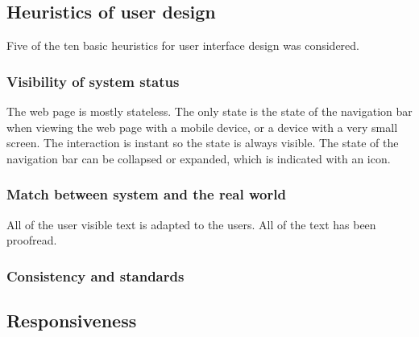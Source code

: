 \documentclass[a4paper]{scrartcl}
\begin{document}
\subsection{Heuristics of user design}

Five of the ten basic heuristics for user interface design was considered.

\subsubsection{Visibility of system status}
The web page is mostly stateless. The only state is the state of the navigation bar when viewing the web page with a mobile device, or a device with a very small screen. The interaction is instant so the state is always visible. The state of the navigation bar can be collapsed or expanded, which is indicated with an icon.

\subsubsection{Match between system and the real world}
All of the user visible text is adapted to the users. All of the text has been proofread.

\subsubsection{Consistency and standards}




\subsection{Responsiveness}
\end{document}
